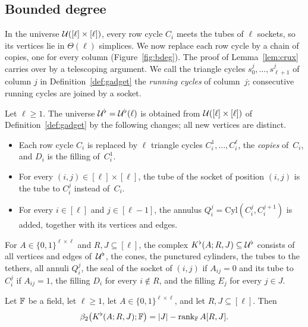 \subsection{Bounded degree}\label{sec:lower-bdeg}

In the universe $\mathcal{U}([\ell]\times[\ell])$, every row cycle $C_i$ meets the tubes of $\ell$ sockets, so its vertices lie in $\Theta(\ell)$ simplices.
We now replace each row cycle by a chain of copies, one for every column (Figure~\ref{fig:bdeg}).
The proof of Lemma~\ref{lem:crux} carries over by a telescoping argument.
We call the triangle cycles $s^j_0,\dots,s^j_{\ell+1}$ of column $j$ in Definition~\ref{def:gadget} the \emph{running cycles} of column~$j$; consecutive running cycles are joined by a socket.

\begin{definition}\label{def:bdeg}
Let $\ell\ge1$.
The universe $\mathcal{U}^{\flat}=\mathcal{U}^{\flat}(\ell)$ is obtained from $\mathcal{U}([\ell]\times[\ell])$ of Definition~\ref{def:gadget} by the following changes; all new vertices are distinct.
\begin{itemize}
\item Each row cycle $C_i$ is replaced by $\ell$ triangle cycles $C_i^1,\dots,C_i^{\ell}$, the \emph{copies} of~$C_i$, and $D_i$ is the filling of~$C_i^1$.
\item For every $(i,j)\in[\ell]\times[\ell]$, the tube of the socket of position $(i,j)$ is the tube to $C_i^j$ instead of~$C_i$.
\item For every $i\in[\ell]$ and $j\in[\ell-1]$, the annulus $Q_i^j=\mathrm{Cyl}(C_i^j,C_i^{j+1})$ is added, together with its vertices and edges.
\end{itemize}
For $A\in\{0,1\}^{\ell\times\ell}$ and $R,J\subseteq[\ell]$, the complex $K^{\flat}(A;R,J)\subseteq\mathcal{U}^{\flat}$ consists of all vertices and edges of~$\mathcal{U}^{\flat}$, the cones, the punctured cylinders, the tubes to the tethers, all annuli $Q_i^j$, the seal of the socket of $(i,j)$ if $A_{ij}=0$ and its tube to $C_i^j$ if $A_{ij}=1$, the filling $D_i$ for every $i\notin R$, and the filling $E_j$ for every $j\in J$.
\end{definition}



\begin{lemma}\label{lem:bdeg-crux}
Let $\mathbb{F}$ be a field, let $\ell\ge1$, let $A\in\{0,1\}^{\ell\times\ell}$, and let $R,J\subseteq[\ell]$.
Then
\[
  \beta_2\bigl(K^{\flat}(A;R,J);\mathbb{F}\bigr)=|J|-\operatorname{rank}_{\mathbb{F}}A[R,J].
\]
\end{lemma}

